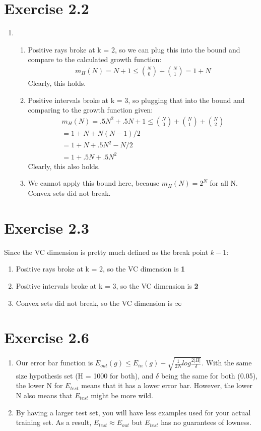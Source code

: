 \documentclass[12pt]{article}
\begin{document}
\section*{Exercise 2.2}
\begin{enumerate}[label=(\alph*)]
	\item 
	\begin{enumerate}
		\item Positive rays broke at k = 2, so we can plug this into the bound and compare to the calculated growth function:
		\begin{gather*}
			m_H(N) = N + 1 \le \binom{N}{0} + \binom{N}{1} = 1 + N
		\end{gather*}
		Clearly, this holds.
		\item Positive intervals broke at k = 3, so plugging that into the bound and comparing to the growth function given:
		\begin{gather*}
			m_H(N) = .5N^2 + .5N + 1 \le \binom{N}{0} + \binom{N}{1} + \binom{N}{2} 
			\\ = 1 + N + N(N-1)/2
			\\ = 1 + N + .5N^2 - N/2
			\\ = 1 + .5N + .5N^2
		\end{gather*}
		Clearly, this also holds.
		\item We cannot apply this bound here, because $m_H(N) = 2^N$ for all N. Convex sets did not break.
	\end{enumerate}
\end{enumerate}
\section*{Exercise 2.3}
Since the VC dimension is pretty much defined as the break point $k-1$:
\begin{enumerate}[label=(\alph*)]
	\item Positive rays broke at k = 2, so the VC dimension is \textbf{1}
	\item Positive intervals broke at k = 3, so the VC dimension is \textbf{2}
	\item Convex sets did not break, so the VC dimension is $\boldsymbol{\infty}$
\end{enumerate}
\section*{Exercise 2.6}
\begin{enumerate}[label=(\alph*)]
	\item Our error bar function is $E_{out}(g) \le E_{in}(g) + \sqrt{\frac{1}{2N}log\frac{2|H|}{\delta}}$. With the same size hypothesis set (H = 1000 for both), and $\delta$ being the same for both (0.05), the lower N for $E_{test}$ means that it has a lower error bar. However, the lower N also means that $E_{test}$ might be more wild.
	\item By having a larger test set, you will have less examples used for your actual training set. As a result, $E_{test} \approx E_{out}$ but $E_{test}$ has no guarantees of lowness.
\end{enumerate}
\end{document}

